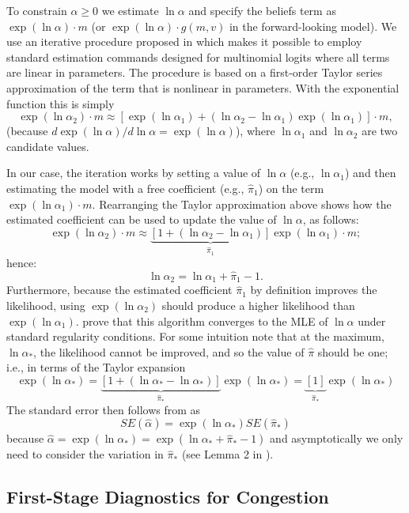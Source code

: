 \documentclass[12pt]{article}
\begin{document}
To constrain $\alpha \geq 0$ we estimate $\ln \alpha$ and specify the beliefs term as $\exp(\ln \alpha) \cdot m$ (or $\exp(\ln \alpha) \cdot g(m,v)$ in the forward-looking model).
We use an iterative procedure proposed in \cite{fader1992} which makes it possible to employ standard estimation commands designed for multinomial logits where all terms are linear in parameters.
The procedure is based on a first-order Taylor series approximation of the term that is nonlinear in parameters.
With the exponential function this is simply
$$ \exp(\ln \alpha_2) \cdot m \approx \left[ \exp(\ln \alpha_1) + (\ln \alpha_2 - \ln \alpha_1) \exp(\ln \alpha_1) \right] \cdot m,$$
(because $d \exp(\ln \alpha) / d \ln \alpha = \exp(\ln \alpha)$), where $\ln \alpha_1$ and $\ln \alpha_2$ are two candidate values.

In our case, the iteration works by setting a value of $\ln \alpha$ (e.g., $\ln \alpha_1$) and then estimating the model with a free coefficient (e.g., $\hat \pi_1$) on the term $\exp(\ln \alpha_1) \cdot m$.  Rearranging the Taylor approximation above shows how the estimated coefficient can be used to update the value of $\ln \alpha$, as follows:
\[
     \exp(\ln \alpha_2) \cdot m \approx \underbrace{[1 + (\ln \alpha_2 - \ln \alpha_1)]}_{\hat \pi_1} \exp(\ln \alpha_1) \cdot m ;
\]
hence:
\[
    \ln \alpha_2 = \ln \alpha_1 + \hat \pi_1 - 1 .
\]
Furthermore, because the estimated coefficient $\hat \pi_1$ by definition improves the likelihood, using $\exp(\ln \alpha_2)$ should produce a higher likelihood than $\exp(\ln \alpha_1)$.
\cite{fader1992} prove that this algorithm converges to the MLE of $\ln \alpha$ under standard regularity conditions.
For some intuition note that at the maximum, $\ln \alpha_*$, the likelihood cannot be improved, and so the value of $\hat \pi$ should be one; i.e., in terms of the Taylor expansion
\[
    \exp(\ln \alpha_*)
    = \underbrace{[1 + (\ln \alpha_* - \ln \alpha_*)]}_{\hat \pi_*} \exp(\ln \alpha_*)
    = \underbrace{[1]}_{\hat \pi_*} \exp(\ln \alpha_*)
\] 
The standard error then follows from \cite{fader1992} as
\[
    SE(\hat \alpha) = \exp(\ln \alpha_*) SE(\hat \pi_*)
\]
because $\hat \alpha = \exp(\ln \alpha_*) = \exp(\ln \alpha_* + \hat \pi_* - 1)$ and asymptotically we only need to consider the variation in $\hat \pi_*$ (see Lemma 2 in \citealp{fader1992}).




\subsection{First-Stage Diagnostics for Congestion}
\label{app:first-stage}
\end{document}
